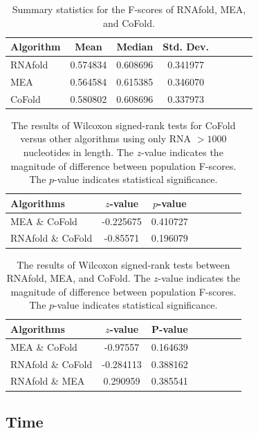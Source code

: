 \documentclass[12pt, a4paper]{article}
\begin{document}
\begin{table}
\centering
\begin{tabular}{l*{6}{c}r}
Algorithm	& Mean & Median & Std. Dev. \\
\hline
RNAfold &  0.574834    &    0.608696 & 0.341977   \\
MEA & 0.564584    &    0.615385  & 0.346070\\
CoFold & 0.580802  &     0.608696 & 0.337973  \\
\end{tabular}
\caption{Summary statistics for the F-scores of RNAfold, MEA, and CoFold.}
\label{tab:summarystats}
\end{table}


\begin{table}
\centering
\begin{tabular}{l*{6}{c}r}
Algorithms	& $z$-value & $p$-value \\
\hline 
MEA \& CoFold &  -0.225675    &    0.410727   \\
RNAfold \& CoFold &  -0.85571    &    0.196079  \\
\end{tabular}
\caption{The results of Wilcoxon signed-rank tests for CoFold versus other algorithms using only RNA $> 1000$ nucleotides in length. The $z$-value indicates the magnitude of difference between population F-scores. The $p$-value indicates statistical significance.}
\label{tab:wilcoxon_large}
\end{table}


\begin{table}
\centering
\begin{tabular}{l*{6}{c}r}
Algorithms	& $z$-value & P-value \\
\hline 
MEA \& CoFold &  -0.97557    &    0.164639   \\
RNAfold \& CoFold &  -0.284113    &    0.388162  \\
RNAfold \& MEA &  0.290959   &    0.385541  \\
\end{tabular}
\caption{The results of Wilcoxon signed-rank tests between RNAfold, MEA, and CoFold. The $z$-value indicates the magnitude of difference between population F-scores. The $p$-value indicates statistical significance.}
\label{tab:wilcoxon}
\end{table}


\subsection{Time}
\end{document}
